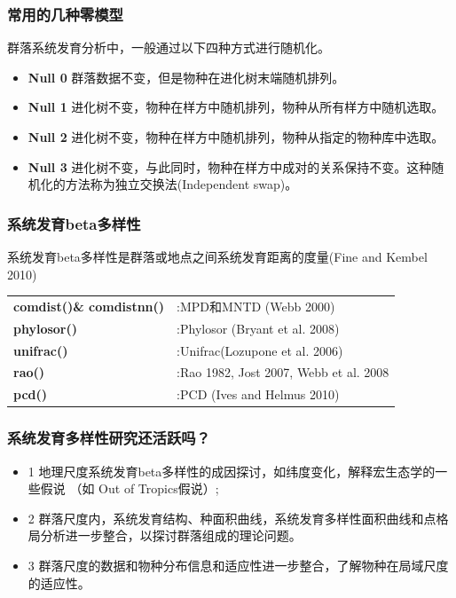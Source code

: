\documentclass[UTF8]{ctexbeamer}
\begin{document}
\begin{frame}
\frametitle{常用的几种零模型}
群落系统发育分析中，一般通过以下四种方式进行随机化。\\
\begin{itemize}
\item {\color{blue}\textbf{Null 0}} 群落数据不变，但是物种在进化树末端随机排列。\\
\item {\color{blue}\textbf{Null 1}} 进化树不变，物种在样方中随机排列，物种从所有样方中随机选取。\\
\item {\color{blue}\textbf{Null 2}} 进化树不变，物种在样方中随机排列，物种从指定的物种库中选取。\\
\item {\color{blue}\textbf{Null 3}} 进化树不变，与此同时，物种在样方中成对的关系保持不变。这种随机化的方法称为独立交换法(Independent swap)。 \\
\end{itemize}
\end{frame}

\begin{frame}
\frametitle{系统发育beta多样性}
系统发育beta多样性是群落或地点之间系统发育距离的度量(Fine and Kembel 2010)\\
\begin{tabular}{ll}
{\color{blue}\textbf{comdist()\& comdistnn()}}&:MPD和MNTD (Webb 2000)\\
{\color{blue}\textbf{phylosor()}}&:Phylosor (Bryant et al. 2008)\\
{\color{blue}\textbf{unifrac()}}&:Unifrac(Lozupone et al. 2006)\\
{\color{blue}\textbf{rao()}}&:Rao 1982, Jost 2007, Webb et al. 2008\\
{\color{blue}\textbf{pcd()}}&:PCD (Ives and Helmus 2010)\\
\end{tabular}
\end{frame}

\begin{frame}
\frametitle{系统发育多样性研究还活跃吗？}
\begin{itemize}
\item 1 地理尺度系统发育beta多样性的成因探讨，如纬度变化，解释宏生态学的一些假说 （如 Out of Tropics假说）; \\
\item 2 群落尺度内，系统发育结构、种面积曲线，系统发育多样性面积曲线和点格局分析进一步整合，以探讨群落组成的理论问题。\\ 
\item 3 群落尺度的数据和物种分布信息和适应性进一步整合，了解物种在局域尺度的适应性。\\
\end{itemize}
\end{frame}
\end{document}
